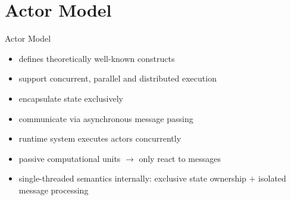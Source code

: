 \documentclass{beamer}
\begin{document}

\section{Actor Model}






\begin{frame}{Actor Model}


\begin{itemize}
  \item defines theoretically well-known constructs
  \item support concurrent, parallel and distributed execution
  \item encapsulate state exclusively
  \item communicate via asynchronous message passing
  \item runtime system executes actors concurrently
  \item passive computational units $\rightarrow$ only react to messages
  \item single-threaded semantics internally: exclusive state ownership $+$ isolated message processing
\end{itemize}

\end{frame}
\end{document}
